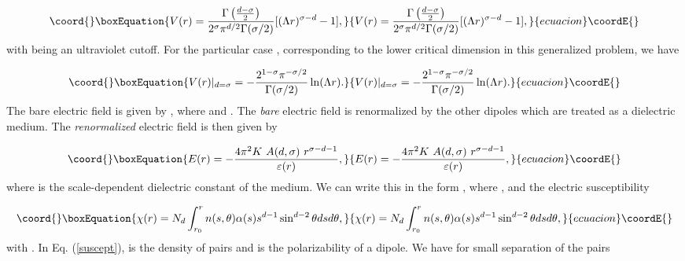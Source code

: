 \documentclass[a4paper,showpacs,preprintnumbers,amsmath,amssymb,prl,twocolumn]{revtex4}
\begin{document}
\begin{equation}\coord{}\boxEquation{
\label{potential}
V(r)=\frac{\Gamma\left(\frac{d-\sigma}{2}\right)}{
2^\sigma\pi^{d/2}\Gamma(\sigma/2)}[(\Lambda r)^{\sigma-d}-1],
}{
V(r)=\frac{\Gamma\left(\frac{d-\sigma}{2}\right)}{
2^\sigma\pi^{d/2}\Gamma(\sigma/2)}[(\Lambda r)^{\sigma-d}-1],
}{ecuacion}\coordE{}\end{equation}
with \myHighlight{$\Lambda$}\coordHE{} being 
an ultraviolet cutoff. For the particular case \coordHE{}, 
corresponding to the lower critical dimension in this generalized problem, we 
have

\begin{equation}\coord{}\boxEquation{
\label{logpot}
V(r)|_{d=\sigma}=-\frac{2^{1-\sigma}\pi^{-\sigma/2}}{\Gamma(\sigma/2)}
\ln(\Lambda r).
}{
V(r)|_{d=\sigma}=-\frac{2^{1-\sigma}\pi^{-\sigma/2}}{\Gamma(\sigma/2)}
\ln(\Lambda r).
}{ecuacion}\coordE{}\end{equation}
The bare electric field is given by 
\coordHE{}, where 
\coordHE{} and 
\coordHE{}. The  {\it bare} electric field is renormalized by the other 
dipoles which are treated as a dielectric medium. The {\it renormalized} 
electric field is then given by

\begin{equation}\coord{}\boxEquation{ 
E(r)=-\frac{4\pi^2K  ~ A(d,\sigma) ~r^{\sigma-d-1}}{\varepsilon(r)}, 
}{ 
E(r)=-\frac{4\pi^2K  ~ A(d,\sigma) ~r^{\sigma-d-1}}{\varepsilon(r)}, 
}{ecuacion}\coordE{}\end{equation}
where \coordHE{} is the scale-dependent dielectric constant of the 
medium. We can write this in the form \coordHE{}, where 
\coordHE{}, and the electric susceptibility  

\begin{equation}\coord{}\boxEquation{
\label{suscept}
\chi(r)=N_d\int_{r_0}^r n(s,\theta)\alpha(s) s^{d-1}\sin^{d-2}\theta 
ds d\theta,
}{
\chi(r)=N_d\int_{r_0}^r n(s,\theta)\alpha(s) s^{d-1}\sin^{d-2}\theta 
ds d\theta,
}{ecuacion}\coordE{}\end{equation}
with \coordHE{}. In Eq. (\ref{suscept}), 
\coordHE{} is the density of pairs and \coordHE{} is the 
polarizability of a dipole. We have for small separation of the pairs 
\end{document}
